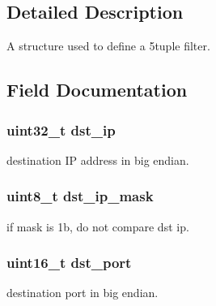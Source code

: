 \subsection{Detailed Description}
A structure used to define a 5tuple filter. 

\subsection{Field Documentation}
\hypertarget{structrte__5tuple__filter_a8fc1e4820a101bd4f2e1f45533e09ca5}{}
\subsubsection[{dst\+\_\+ip}]{\setlength{\rightskip}{0pt plus 5cm}uint32\+\_\+t dst\+\_\+ip}\label{structrte__5tuple__filter_a8fc1e4820a101bd4f2e1f45533e09ca5}
destination I\+P address in big endian. \hypertarget{structrte__5tuple__filter_a56b9fc3d42af37b6179f4cac47e6ac56}{}
\subsubsection[{dst\+\_\+ip\+\_\+mask}]{\setlength{\rightskip}{0pt plus 5cm}uint8\+\_\+t dst\+\_\+ip\+\_\+mask}\label{structrte__5tuple__filter_a56b9fc3d42af37b6179f4cac47e6ac56}
if mask is 1b, do not compare dst ip. \hypertarget{structrte__5tuple__filter_ae18defed4756b8c15e34718f51e86e55}{}
\subsubsection[{dst\+\_\+port}]{\setlength{\rightskip}{0pt plus 5cm}uint16\+\_\+t dst\+\_\+port}\label{structrte__5tuple__filter_ae18defed4756b8c15e34718f51e86e55}
destination port in big endian. \hypertarget{structrte__5tuple__filter_a3c1c59f1493644594dfc6e6907a97936}{}

